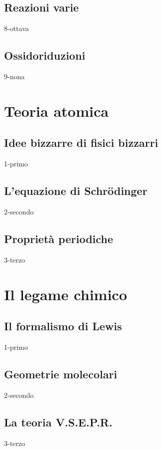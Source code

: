 \documentclass[12pt]{book}%
\begin{document}
  \section{Reazioni varie}
    {8-ottava}

  \section{Ossidoriduzioni}
    {9-nona}

\chapter{Teoria atomica}

  \section{Idee bizzarre di fisici bizzarri}
    {1-primo}

    \section{L'equazione di Schrödinger}
    {2-secondo}

    \newpage

  \section{Proprietà periodiche}
    {3-terzo}

\chapter{Il legame chimico}

  \section{Il formalismo di Lewis}
    {1-primo}

    \newpage

  \section{Geometrie molecolari}
    {2-secondo}

    \newpage

  \section{La teoria V.S.E.P.R.}
    {3-terzo}
\end{document}
